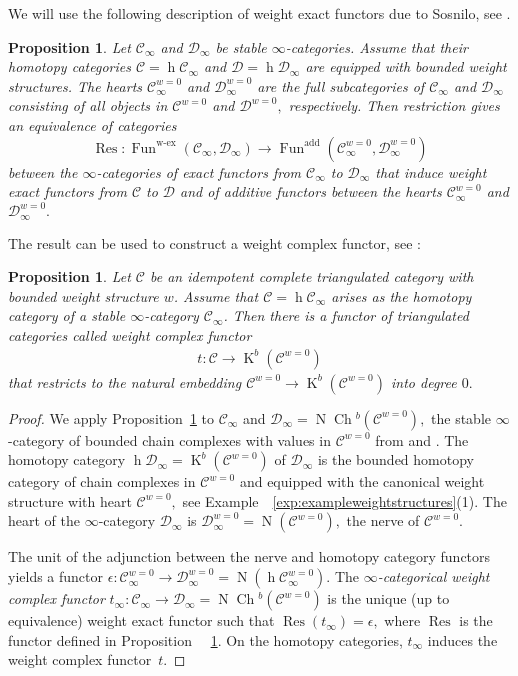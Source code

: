 \documentclass{amsart}
\theoremstyle{plain}
\newtheorem{proposition}[theorem]{Proposition}
\theoremstyle{TheoremNum}
\theoremstyle{definition}
\theoremstyle{remark}
\numberwithin{equation}{section}
\newcommand{\Cc}{\mathcal{C}}
\newcommand{\Dd}{\mathcal{D}}
\newcommand{\Ccc}{\mathcal{C}_{\infty}}
\newcommand{\Ddd}{\mathcal{D}_{\infty}}
\newcommand{\h}{\operatorname{h}\!}
\newcommand{\Nerve}{\operatorname{N}\!}
\newcommand{\Ch}{\operatorname{Ch}\!}
\newcommand{\Fun}{\operatorname{Fun}}
\newcommand{\K}{\operatorname{K}}
\newcommand{\Res}{\operatorname{Res}}
\begin{document}
We will use the following description of weight exact functors due to Sosnilo, see \cite[Proposition 3.3(b)]{sosnilo_theorem_2017}.
\begin{proposition}\label{prop:functorsbytheheart}
Let $\Ccc$ and $\Ddd$ be stable $\infty$-categories. Assume that their homotopy categories $\Cc=\h\Ccc$ and $\Dd=\h\Ddd$ are equipped with bounded weight structures. The hearts $\Ccc^{w=0}$ and $\Ddd^{w=0}$ are the full subcategories of $\Ccc$ and $\Ddd$ consisting of all objects in $\Cc^{w=0}$ and $\Dd^{w=0},$ respectively. Then restriction gives an equivalence of categories 
$$\Res:\Fun^{\operatorname{w-ex}}(\Ccc,\Ddd)\to\Fun^{\operatorname{add}}(\Ccc^{w=0},\Ddd^{w=0})$$
between the $\infty$-categories of exact functors from $\Ccc$ to $\Ddd$ that induce weight exact functors from $\Cc$ to $\Dd$ and of additive functors between the hearts $\Ccc^{w=0}$ and $\Ddd^{w=0}.$
\end{proposition}
The result can be used to construct a weight complex functor, see \cite[Corollary 3.5]{sosnilo_theorem_2017}:
\begin{proposition} \label{prop:weightcomplexfunctor} Let $\Cc$ be an idempotent complete triangulated category with bounded weight structure $w$. Assume that $\Cc=\h\Ccc$ arises as the homotopy category of a  stable $\infty$-category $\Ccc$. Then there is a functor of triangulated categories called \emph{weight complex functor}
\begin{align}
    t:\Cc\to\K^b(\Cc^{w=0})
\end{align}
that restricts to the natural embedding $\Cc^{w=0}\to \K^b(\Cc^{w=0})$ into degree $0.$
\end{proposition}
\begin{proof}
We apply Proposition~\ref{prop:functorsbytheheart} to $\Ccc$ and $\Ddd=\Nerve\Ch^b(\Cc^{w=0}),$ the stable $\infty$-category of bounded chain complexes with values in $\Cc^{w=0}$ from \cite[Example 4.4.5.1]{lurie_higher_2009} and \cite[Section 1.3.1]{lurie_higher_2012}.
The homotopy category  $\h\Ddd=\K^b(\Cc^{w=0})$ of $\Ddd$ is the bounded homotopy category of chain complexes in $\Cc^{w=0}$ and equipped with the canonical weight structure with heart $\Cc^{w=0},$ see Example~~\ref{exp:exampleweightstructures}(1). The heart of the $\infty$-category $\Ddd$ is $\Ddd^{w=0}=\Nerve(\Cc^{w=0}),$ the nerve of $\Cc^{w=0}.$ 

The unit of the adjunction between the nerve and homotopy category functors yields a functor $\epsilon:\Ccc^{w=0}\to\Ddd^{w=0}=\Nerve(\h\Ccc^{w=0}).$ The \emph{$\infty$-categorical weight complex functor}
$t_\infty: \Ccc\to \Ddd=\Nerve\Ch^b(\Cc^{w=0})$
is the unique (up to equivalence) weight exact functor such that $\Res(t_\infty)=\epsilon,$ where $\Res$ is the functor defined in Proposition ~~\ref{prop:functorsbytheheart}.
On the homotopy categories, $t_\infty$ induces the weight complex functor~$t$.
\end{proof}
\end{document}
